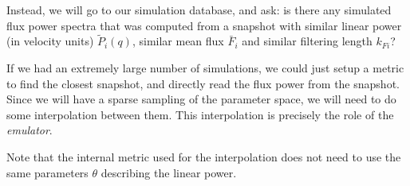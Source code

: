 Instead, we will go to our simulation database, and ask:
is there any simulated flux power spectra that was computed from a snapshot
with similar linear power (in velocity units) $\tilde P_i(q)$, similar
mean flux $\bar F_i$ and similar filtering length $k_{Fi}$?

If we had an extremely large number of simulations, we could just setup a
metric to find the closest snapshot, and directly read the flux power
from the snapshot.
Since we will have a sparse sampling of the parameter space, we will need
to do some interpolation between them.
This interpolation is precisely the role of the \textit{emulator}.

Note that the internal metric used for the interpolation does not need to 
use the same parameters $\theta$ describing the linear power.

